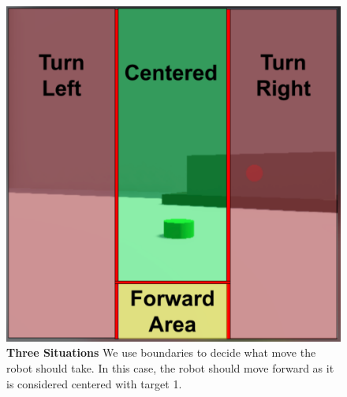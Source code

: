 \begin{figure}
    \centering
    \includegraphics[width=0.85\columnwidth]{figures/src/three_situations.png}
    \caption{
	    \textbf{Three Situations} We use boundaries to decide what move the robot should take. In this case, the robot should move forward as it is considered centered with target 1.
    }
    \label{fig:three_situations}
\end{figure}
